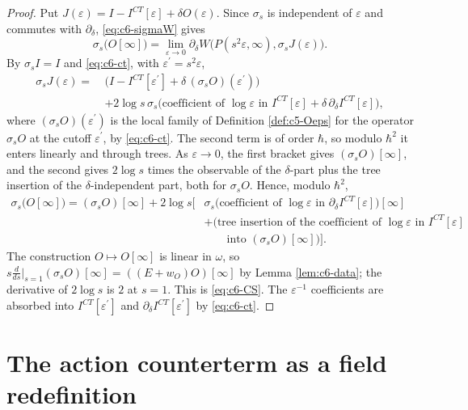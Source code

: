 \begin{proof}
Put $J(\varepsilon)=I-I^{CT}[\varepsilon]+\delta O(\varepsilon)$. Since $\sigma_s$ is independent of $\varepsilon$ and commutes with $\partial_\delta$, \eqref{eq:c6-sigmaW} gives
\[
\sigma_s\big(O[\infty]\big)=\lim_{\varepsilon\to0}\partial_\delta W\big(P(s^2\varepsilon,\infty),\sigma_s J(\varepsilon)\big).
\]
By $\sigma_s I=I$ and \eqref{eq:c6-ct}, with $\varepsilon^{\prime}=s^2\varepsilon$,
\[
\begin{aligned}
\sigma_s J(\varepsilon)=\ &\Big(I-I^{CT}[\varepsilon^{\prime}]+\delta\,(\sigma_s O)(\varepsilon^{\prime})\Big)\\
&+2\log s\,\sigma_s\big(\text{coefficient of }\log\varepsilon\text{ in }I^{CT}[\varepsilon]+\delta\,\partial_\delta I^{CT}[\varepsilon]\big),
\end{aligned}
\]
where $(\sigma_s O)(\varepsilon^{\prime})$ is the local family of Definition \ref{def:c5-Oeps} for the operator $\sigma_s O$ at the cutoff $\varepsilon^{\prime}$, by \eqref{eq:c6-ct}. The second term is of order $\hbar$, so modulo $\hbar^2$ it enters linearly and through trees. As $\varepsilon\to0$, the first bracket gives $(\sigma_s O)[\infty]$, and the second gives $2\log s$ times the observable of the $\delta$-part plus the tree insertion of the $\delta$-independent part, both for $\sigma_s O$. Hence, modulo $\hbar^2$,
\[
\begin{aligned}
\sigma_s\big(O[\infty]\big)=(\sigma_s O)[\infty]+2\log s\Big[&\sigma_s\big(\text{coefficient of }\log\varepsilon\text{ in }\partial_\delta I^{CT}[\varepsilon]\big)[\infty]\\
&+\big(\text{tree insertion of the coefficient of }\log\varepsilon\text{ in }I^{CT}[\varepsilon]\\
&\qquad\text{into }(\sigma_s O)[\infty]\big)\Big].
\end{aligned}
\]
The construction $O\mapsto O[\infty]$ is linear in $\omega$, so $s\frac{d}{ds}\big|_{s=1}(\sigma_s O)[\infty]=((E+w_O)O)[\infty]$ by Lemma \ref{lem:c6-data}; the derivative of $2\log s$ is $2$ at $s=1$. This is \eqref{eq:c6-CS}. The $\varepsilon^{-1}$ coefficients are absorbed into $I^{CT}[\varepsilon^{\prime}]$ and $\partial_\delta I^{CT}[\varepsilon^{\prime}]$ by \eqref{eq:c6-ct}.
\end{proof}

\section{The action counterterm as a field redefinition}

